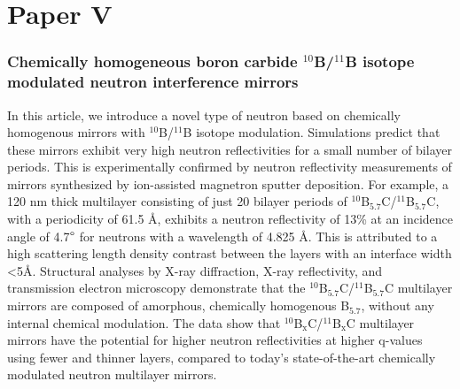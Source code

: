 \section{Paper V}
\subsubsection*{Chemically homogeneous boron carbide $^{10}$B/$^{11}$B isotope modulated neutron interference mirrors}
In this article, we introduce a novel type of neutron based on chemically homogenous \natBC mirrors with $^\textrm{10}$B/$^\textrm{11}$B  isotope modulation. Simulations predict that these mirrors exhibit very high neutron reflectivities for a small number of bilayer periods. This is experimentally confirmed by neutron reflectivity measurements of mirrors synthesized by ion-assisted magnetron sputter deposition. For example, a 120 nm thick multilayer consisting of just 20 bilayer periods of $^\textrm{10}$B$_\textrm{5.7}$C/$^\textrm{11}$B$_\textrm{5.7}$C, with a periodicity of 61.5 Å, exhibits a neutron reflectivity of 13\% at an incidence angle of 4.7$\degree$ for neutrons with a wavelength of 4.825 Å. This is attributed to a high scattering length density contrast between the layers with an interface width <5Å. Structural analyses by X-ray diffraction, X-ray reflectivity, and transmission electron microscopy demonstrate that the $^\textrm{10}$B$_\textrm{5.7}$C/$^\textrm{11}$B$_\textrm{5.7}$C multilayer mirrors are composed of amorphous, chemically homogenous B$_\textrm{5.7}$, without any internal chemical modulation. The data show that $^\textrm{10}$B$_\textrm{x}$C/$^\textrm{11}$B$_\textrm{x}$C multilayer mirrors have the potential for higher neutron reflectivities at higher q-values using fewer and thinner layers, compared to today’s state-of-the-art chemically modulated neutron multilayer mirrors.